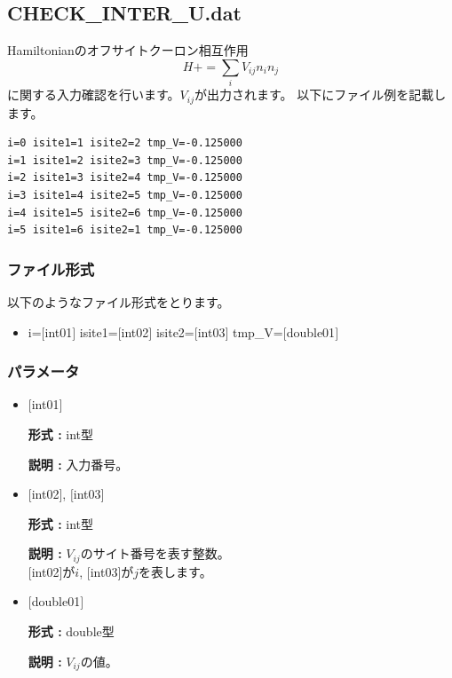 \newpage
\subsection{CHECK\_INTER\_U.dat}
Hamiltonianのオフサイトクーロン相互作用
\begin{equation}
H+=\sum_{i} V_{ij} n_{i} n_{j}
\end{equation}
に関する入力確認を行います。$V_{ij}$が出力されます。
以下にファイル例を記載します。

\begin{minipage}{12.5cm}
\begin{screen}
\begin{verbatim}
i=0 isite1=1 isite2=2 tmp_V=-0.125000 
i=1 isite1=2 isite2=3 tmp_V=-0.125000 
i=2 isite1=3 isite2=4 tmp_V=-0.125000 
i=3 isite1=4 isite2=5 tmp_V=-0.125000 
i=4 isite1=5 isite2=6 tmp_V=-0.125000 
i=5 isite1=6 isite2=1 tmp_V=-0.125000 
\end{verbatim}
\end{screen}
\end{minipage}

\subsubsection{ファイル形式}
以下のようなファイル形式をとります。
 \begin{itemize}
   \item  i=$[$int01$]$ isite1=$[$int02$]$ isite2=$[$int03$]$ tmp\_V=$[$double01$]$ 
 \end{itemize}
 
\subsubsection{パラメータ}
 \begin{itemize}

    \item  $[$int01$]$ 
   
    {\bf 形式 :} int型

   {\bf 説明 :} 入力番号。
      
   \item  $[$int02$]$, $[$int03$]$
   
    {\bf 形式 :} int型

    {\bf 説明 :}  $V_{ij}$のサイト番号を表す整数。 \\
    $[$int02$]$が$i$, $[$int03$]$が$j$を表します。
 
   \item  $[$double01$]$ 
   
    {\bf 形式 :} double型

   {\bf 説明 :} $V_{ij}$の値。
\end{itemize}


